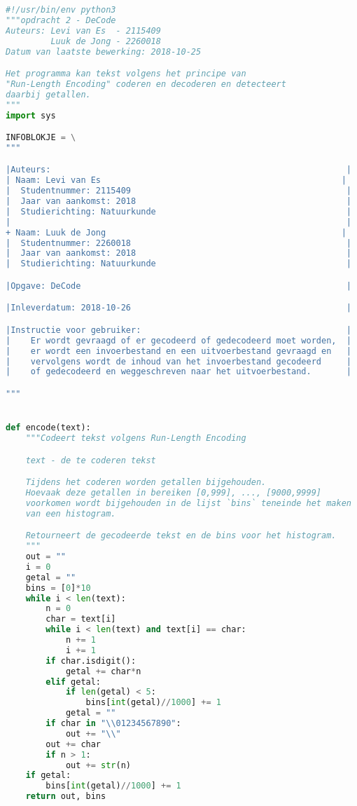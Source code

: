 \documentclass{article}
\begin{document}
 \begin{lstlisting}[frame=single, language=python]
 #!/usr/bin/env python3
"""opdracht 2 - DeCode
Auteurs: Levi van Es  - 2115409
         Luuk de Jong - 2260018
Datum van laatste bewerking: 2018-10-25

Het programma kan tekst volgens het principe van
"Run-Length Encoding" coderen en decoderen en detecteert
daarbij getallen.
"""
import sys

INFOBLOKJE = \
"""

|Auteurs:                                                           |
| Naam: Levi van Es                                                |
|  Studentnummer: 2115409                                           |
|  Jaar van aankomst: 2018                                          |
|  Studierichting: Natuurkunde                                      |
|                                                                   |
+ Naam: Luuk de Jong                                               |
|  Studentnummer: 2260018                                           |
|  Jaar van aankomst: 2018                                          |
|  Studierichting: Natuurkunde                                      |

|Opgave: DeCode                                                     |

|Inleverdatum: 2018-10-26                                           |

|Instructie voor gebruiker:                                         |
|    Er wordt gevraagd of er gecodeerd of gedecodeerd moet worden,  |
|    er wordt een invoerbestand en een uitvoerbestand gevraagd en   |
|    vervolgens wordt de inhoud van het invoerbestand gecodeerd     |
|    of gedecodeerd en weggeschreven naar het uitvoerbestand.       |

"""


def encode(text):
    """Codeert tekst volgens Run-Length Encoding

    text - de te coderen tekst

    Tijdens het coderen worden getallen bijgehouden.
    Hoevaak deze getallen in bereiken [0,999], ..., [9000,9999]
    voorkomen wordt bijgehouden in de lijst `bins` teneinde het maken
    van een histogram.

    Retourneert de gecodeerde tekst en de bins voor het histogram.
    """
    out = ""
    i = 0
    getal = ""
    bins = [0]*10
    while i < len(text):
        n = 0
        char = text[i]
        while i < len(text) and text[i] == char:
            n += 1
            i += 1
        if char.isdigit():
            getal += char*n
        elif getal:
            if len(getal) < 5:
                bins[int(getal)//1000] += 1
            getal = ""
        if char in "\\01234567890":
            out += "\\"
        out += char
        if n > 1:
            out += str(n)
    if getal:
        bins[int(getal)//1000] += 1
    return out, bins



\end{lstlisting}
\end{document}
